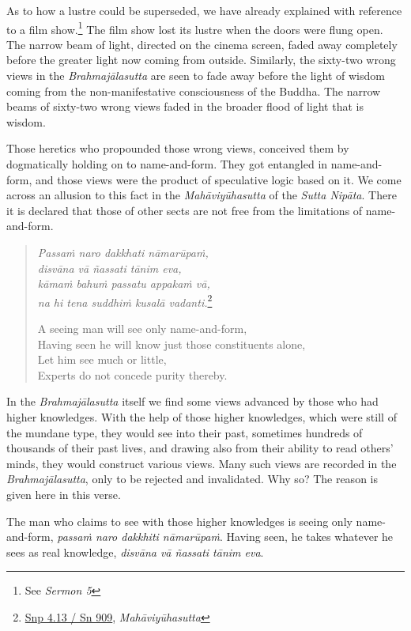 As to how a lustre could be superseded, we have already explained with reference to a film show.\footnote{See \emph{Sermon 5}} The film show lost its lustre when the doors were flung open. The narrow beam of light, directed on the cinema screen, faded away completely before the greater light now coming from outside. Similarly, the sixty-two wrong views in the \emph{Brahmajālasutta} are seen to fade away before the light of wisdom coming from the non-manifestative consciousness of the Buddha. The narrow beams of sixty-two wrong views faded in the broader flood of light that is wisdom.

Those heretics who propounded those wrong views, conceived them by dogmatically holding on to name-and-form. They got entangled in name-and-form, and those views were the product of speculative logic based on it. We come across an allusion to this fact in the \emph{Mahāviyūhasutta} of the \emph{Sutta Nipāta}. There it is declared that those of other sects are not free from the limitations of name-and-form.

\begin{quote}
\emph{Passaṁ naro dakkhati nāmarūpaṁ,}\\
\emph{disvāna vā ñassati tānim eva,}\\
\emph{kāmaṁ bahuṁ passatu appakaṁ vā,}\\
\emph{na hi tena suddhiṁ kusalā vadanti.}\footnote{\href{https://suttacentral.net/snp4.13/pli/ms}{Snp 4.13 / Sn 909}, \emph{Mahāviyūhasutta}}

A seeing man will see only name-and-form,\\
Having seen he will know just those constituents alone,\\
Let him see much or little,\\
Experts do not concede purity thereby.
\end{quote}

In the \emph{Brahmajālasutta} itself we find some views advanced by those who had higher knowledges. With the help of those higher knowledges, which were still of the mundane type, they would see into their past, sometimes hundreds of thousands of their past lives, and drawing also from their ability to read others' minds, they would construct various views. Many such views are recorded in the \emph{Brahmajālasutta}, only to be rejected and invalidated. Why so? The reason is given here in this verse.

The man who claims to see with those higher knowledges is seeing only name-and-form, \emph{passaṁ naro dakkhiti nāmarūpaṁ}. Having seen, he takes whatever he sees as real knowledge, \emph{disvāna vā ñassati tānim eva}.

